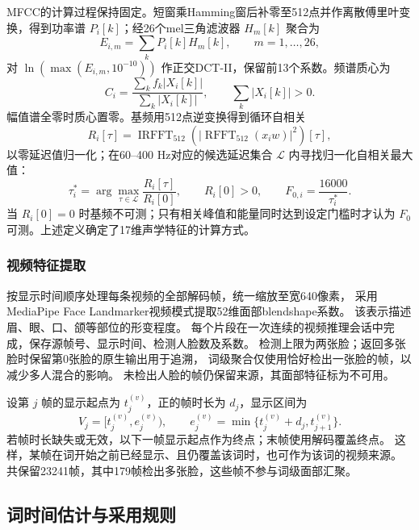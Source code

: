 \documentclass[bwprint]{gmcmthesis}
\begin{document}
MFCC的计算过程保持固定。短窗乘Hamming窗后补零至512点并作离散傅里叶变换，得到功率谱
$P_i[k]$；经26个mel三角滤波器 $H_m[k]$ 聚合为
\begin{equation}
 E_{i,m}=\sum_kP_i[k]H_m[k],\qquad m=1,\ldots,26,
 \label{eq:p1-mel-energy}
\end{equation}
对 $\ln(\max(E_{i,m},10^{-10}))$ 作正交DCT-II，保留前13个系数。频谱质心为
\begin{equation}
 C_i=\frac{\sum_k f_k|X_i[k]|}{\sum_k|X_i[k]|},\qquad \sum_k|X_i[k]|>0.
 \label{eq:p1-centroid}
\end{equation}
幅值谱全零时质心置零。基频用512点逆变换得到循环自相关
\[
R_i[\tau]=\operatorname{IRFFT}_{512}(|\operatorname{RFFT}_{512}(x_iw)|^2)[\tau],
\]
以零延迟值归一化；在60--400 Hz对应的候选延迟集合 $\mathcal L$ 内寻找归一化自相关最大值：
\begin{equation}
 \tau_i^*=\arg\max_{\tau\in\mathcal L}
 \frac{R_i[\tau]}{R_i[0]},\qquad R_i[0]>0,
 \qquad F_{0,i}=\frac{16000}{\tau_i^*}.
 \label{eq:p1-pitch}
\end{equation}
当 $R_i[0]=0$ 时基频不可测；只有相关峰值和能量同时达到设定门槛时才认为 $F_0$ 可测。上述定义确定了17维声学特征的计算方式。


\subsubsection{视频特征提取}
按显示时间顺序处理每条视频的全部解码帧，统一缩放至宽640像素，
采用MediaPipe Face Landmarker视频模式提取52维面部blendshape系数。
该表示描述眉、眼、口、颌等部位的形变程度\citep{blendshapes2023}。
每个片段在一次连续的视频推理会话中完成，保存源帧号、显示时间、检测人脸数及系数。
检测上限为两张脸；返回多张脸时保留第0张脸的原生输出用于追溯，
词级聚合仅使用恰好检出一张脸的帧，以减少多人混合的影响。
未检出人脸的帧仍保留来源，其面部特征标为不可用。

设第 $j$ 帧的显示起点为 $t_j^{(v)}$，正的帧时长为 $d_j$，显示区间为
\begin{equation}
 V_j=[t_j^{(v)},e_j^{(v)}),\qquad
 e_j^{(v)}=\min\{t_j^{(v)}+d_j,t_{j+1}^{(v)}\}.
 \label{eq:p1-frame-interval}
\end{equation}
若帧时长缺失或无效，以下一帧显示起点作为终点；末帧使用解码覆盖终点。
这样，某帧在词开始之前已经显示、且仍覆盖该词时，也可作为该词的视频来源。
共保留23241帧，其中179帧检出多张脸，这些帧不参与词级面部汇聚。

\subsection{词时间估计与采用规则}
\end{document}
